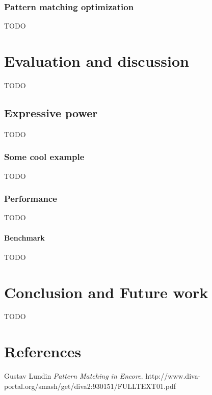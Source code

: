 \documentclass[10pt]{report}
\begin{document}
\subsection{Pattern matching optimization}
TODO

\chapter{Evaluation and discussion}
TODO
\section{Expressive power}
TODO
\subsection{Some cool example}
TODO
\subsection{Performance}
TODO
\subsubsection{Benchmark}
TODO
\chapter{Conclusion and Future work}
TODO

\printbibliography

\chapter{References}


\begin{thebibliography}{9}
Gustav Lundin
\textit{Pattern Matching in Encore}.
http://www.diva-portal.org/smash/get/diva2:930151/FULLTEXT01.pdf

\end{thebibliography}


\begin{appendices}
\end{appendices}
\end{document}
